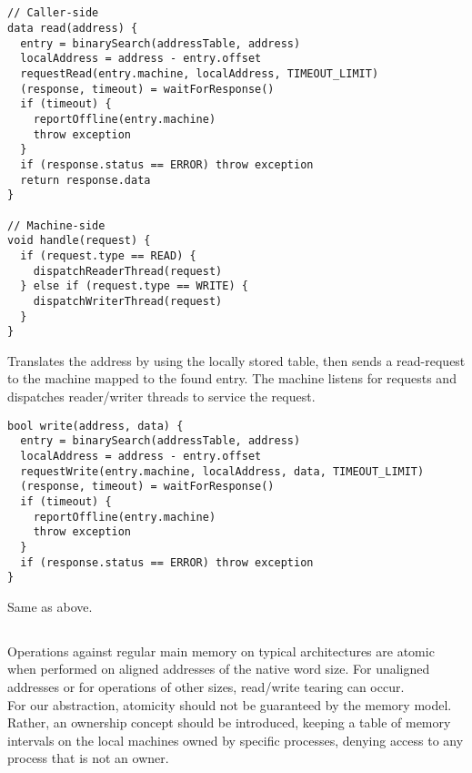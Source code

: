 \documentclass[12pt]{article}
\begin{document}
\subsection{} %

\begin{verbatim}
// Caller-side
data read(address) {
  entry = binarySearch(addressTable, address)
  localAddress = address - entry.offset
  requestRead(entry.machine, localAddress, TIMEOUT_LIMIT)
  (response, timeout) = waitForResponse()
  if (timeout) {
    reportOffline(entry.machine)
    throw exception
  }
  if (response.status == ERROR) throw exception
  return response.data
}

// Machine-side
void handle(request) {
  if (request.type == READ) {
    dispatchReaderThread(request)
  } else if (request.type == WRITE) {
    dispatchWriterThread(request)
  }
}
\end{verbatim}

Translates the address by using the locally stored table, then sends a read-request to the machine mapped to the found entry. The machine listens for requests and dispatches reader/writer threads to service the request.

\begin{verbatim}
bool write(address, data) {
  entry = binarySearch(addressTable, address)
  localAddress = address - entry.offset
  requestWrite(entry.machine, localAddress, data, TIMEOUT_LIMIT)
  (response, timeout) = waitForResponse()
  if (timeout) {
    reportOffline(entry.machine)
    throw exception
  }
  if (response.status == ERROR) throw exception
}
\end{verbatim}

Same as above.

\subsection{} %

Operations against regular main memory on typical architectures are atomic when performed on aligned addresses of the native word size. For unaligned addresses or for operations of other sizes, read/write tearing can occur. \\
For our abstraction, atomicity should not be guaranteed by the memory model. Rather, an ownership concept should be introduced, keeping a table of memory intervals on the local machines owned by specific processes, denying access to any process that is not an owner.

\subsection{} %
\end{document}
